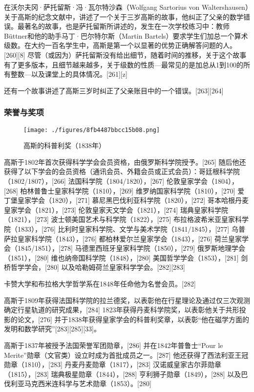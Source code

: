 在沃尔夫冈·萨托留斯·冯·瓦尔特沙森（Wolfgang Sartorius von Waltershausen）关于高斯的纪念文献中，讲述了一个关于三岁高斯的故事，他纠正了父亲的数学错误。最著名的故事，也是萨托留斯所讲述的，发生在一次学校练习中：教师Büttner和他的助手马丁·巴尔特尔斯（Martin Bartels）要求学生们加总一个算术级数。在大约一百名学生中，高斯是第一个以显著的优势正确解答问题的人。[260][8] 尽管（或因为）萨托留斯没有给出细节，随着时间的推移，关于这个故事有了更多版本，且细节越来越多，关于级数的性质—最常见的是加总从1到100的所有整数—以及课堂上的具体情况。[261][z]

还有一个故事讲述了高斯三岁时纠正了父亲账目中的一个错误。[263][264]
\subsubsection{荣誉与奖项}
\begin{figure}[ht]
\centering
\texttt{[image: ./figures/8fb4487bbcc15b08.png]}
\caption{高斯的科普利奖（1838年）} \label{fig_KRGS_25}
\end{figure}
高斯于1802年首次获得科学学会会员资格，由俄罗斯科学院授予。[265] 随后他还获得了以下学会的会员资格（通讯会员、外籍会员或正式会员）：哥廷根科学院（1802/1807），[266] 法国科学院（1804/1820），[267] 伦敦皇家学会（1804），[268] 柏林普鲁士皇家科学院（1810），[269] 维罗纳国家科学院（1810），[270] 爱丁堡皇家学会（1820），[271] 慕尼黑巴伐利亚科学院（1820），[272] 哥本哈根丹麦皇家学会（1821），[273] 伦敦皇家天文学会（1821），[274] 瑞典皇家科学院（1821），[273] 波士顿美国艺术与科学院（1822），[275] 布拉格波希米亚皇家科学院（1833），[276] 比利时皇家科学院、文学与美术学院（1841/1845），[277] 乌普萨拉皇家科学院（1843），[276] 都柏林爱尔兰皇家学会（1843），[276] 荷兰皇家学会（1845/1851），[278] 马德里西班牙皇家科学院（1850），[279] 俄罗斯地理学会（1851），[280] 维也纳帝国科学院（1848），[280] 美国哲学学会（1853），[281] 剑桥哲学学会，[280] 以及哈勒姆荷兰皇家科学学会。[282][283]

卡赞大学和布拉格大学哲学系在1848年任命他为名誉会员。[282]

高斯于1809年获得法国科学院的拉兰德奖，以表彰他在行星理论及通过仅三次观测确定行星轨道的研究成果，[284] 1823年获得丹麦科学院奖，以表彰他关于共形投影的论文，[276] 并于1838年获得皇家学会的科普利奖章，以表彰“他在磁学方面的发明和数学研究”[283][285][33]。

高斯于1837年被授予法国荣誉军团勋章，[286] 并在1842年普鲁士“Pour le Merite”勋章（文官类）设立时成为首批成员之一。[287] 他还获得了西法利亚王冠勋章（1810），[283] 丹麦丹麦勋章（1817），[283] 汉诺威皇家古尔菲勋章（1815），[283] 瑞典极星勋章（1844），[288] 亨利狮子勋章（1849），[288] 以及巴伐利亚马克西米连科学与艺术勋章（1853）。[280]

